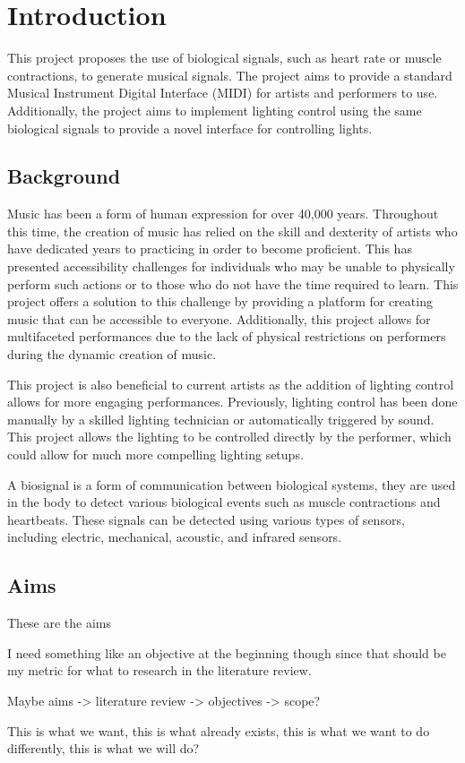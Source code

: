 \chapter{Introduction}
This project proposes the use of biological signals, such as heart rate or muscle contractions, to generate musical signals.
The project aims to provide a standard Musical Instrument Digital Interface (MIDI) for artists and performers to use.
Additionally, the project aims to implement lighting control using the same biological signals to provide a novel interface for controlling lights.

\section{Background}
Music has been a form of human expression for over 40,000 years\cite{killin:2018}.
Throughout this time, the creation of music has relied on the skill and dexterity of artists
who have dedicated years to practicing in order to become proficient.
This has presented accessibility challenges for individuals who may be unable to physically perform such actions
or to those who do not have the time required to learn.
This project offers a solution to this challenge by providing a platform for creating music that can be accessible to everyone.
Additionally, this project allows for multifaceted performances due to the lack of physical restrictions on performers
during the dynamic creation of music.

This project is also beneficial to current artists as the addition of lighting control allows for more engaging performances.
Previously, lighting control has been done manually by a skilled lighting technician or automatically triggered by sound.
This project allows the lighting to be controlled directly by the performer, which could allow for much more compelling lighting setups.


A biosignal is a form of communication between biological systems\cite{semmlow:2018},
they are used in the body to detect various biological events such as muscle contractions and heartbeats\cite{escabí:2012}.
These signals can be detected using various types of sensors, including electric, mechanical, acoustic, and infrared sensors\cite{kaniusas:2012}.

\section{Aims}
These are the aims

I need something like an objective at the beginning though since that should be my metric
for what to research in the literature review.

Maybe aims -> literature review -> objectives -> scope?

This is what we want, this is what already exists, this is what we want to do differently,
this is what we will do?

